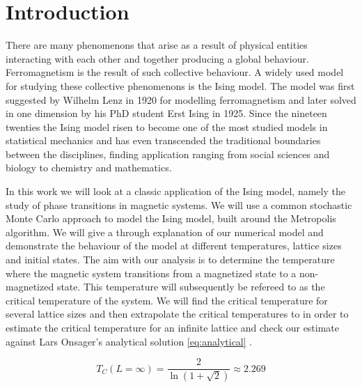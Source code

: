 \section{Introduction}
There are many phenomenons that arise as a result of physical entities
interacting with each other and together producing a global behaviour.
Ferromagnetism is the result of such collective behaviour. A widely used model
for studying these collective phenomenons is the Ising model.
The model was first suggested by Wilhelm Lenz in 1920 for modelling
ferromagnetism and later solved 
in one dimension by his PhD student Erst Ising in 1925. Since the nineteen
twenties the Ising model risen to become one of the most studied models in
statistical mechanics and has even
transcended the traditional boundaries between the disciplines, finding
application ranging from social sciences and biology to chemistry and
mathematics.

In this work we will look at a classic application of the Ising model, namely
the study of phase transitions in magnetic systems. We will use a common
stochastic Monte Carlo approach to model the Ising model, built around the Metropolis algorithm. We will give a through explanation of our numerical model
and demonstrate the behaviour of the model at different temperatures, lattice
sizes and initial states. The aim with our analysis is to determine the
temperature where the magnetic system transitions from a 
magnetized state to a non-magnetized state. This
temperature will subsequently be refereed to as the critical
temperature of the system. We will find the critical temperature for several lattice sizes
and then extrapolate the critical temperatures to in order to estimate the
critical temperature for an infinite lattice and
check our estimate against Lars Onsager's analytical solution
\cref{eq:analytical} \parencite{Lars1944}.

\begin{equation}
  \label{eq:analytical}
  T_C(L=\infty) = \frac{2}{\ln(1 + \sqrt2)} \approx 2.269
\end{equation}



